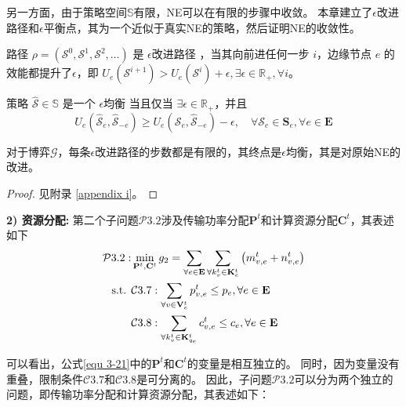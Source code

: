 \noindent 另一方面，由于策略空间$\mathbb{S}$有限，NE可以在有限的步骤中收敛。
本章建立了$\epsilon$改进路径和$\epsilon$平衡点\cite{chew2016potential}，其为一个近似于真实NE的策略，然后证明NE的收敛性。
\begin{definition} 
	路径 $\rho=\left(\mathcal{S}^{0}, \mathcal{S}^{1}, \mathcal{S}^{2}, \ldots\right)$ 是 $\epsilon$改进路径 \cite{chew2016potential}，当其向前进任何一步 $i$，边缘节点 $e$ 的效能都提升了$\epsilon$，即 $U_{e}\left(\mathcal{S}^{i+1}\right) > U_{e}\left(\mathcal{S}^{i}\right) + \epsilon, \exists \epsilon \in \mathbb{R}_{+}, \forall i$。
\end{definition}
\begin{definition}
	策略 $\mathcal{\hat{S}} \in \mathbb{S}$ 是一个 $\epsilon$均衡 \cite{chew2016potential} 当且仅当 $\exists \epsilon \in \mathbb{R}_{+}$，并且
	\begin{equation}
		U_{e}\left(\mathcal{\hat{S}}_{e}, \mathcal{\hat{S}}_{-e}\right) \geq U_{e}\left(\mathcal{S}_{e}, \mathcal{\hat{S}}_{-e}\right) - \epsilon, \quad \forall \mathcal{S}_{e} \in \mathbf{S}_{e}, \forall e \in \mathbf{E}
	\end{equation}
\end{definition}
\begin{theorem}
对于博弈$\mathcal{G}$，每条$\epsilon$改进路径的步数都是有限的，其终点是$\epsilon$均衡，其是对原始NE的改进。
\label{theorem 4-3}
\end{theorem}
\begin{proof} 见附录 \ref{appendix i}。
\end{proof}

\textbf{2) 资源分配:} 第二个子问题$\mathcal{P}3.2$涉及传输功率分配$\mathbf{P}^{t}$和计算资源分配$\mathbf{C}^{t}$，其表述如下
\begin{align}
	\mathcal{P}3.2: &\min_{\mathbf{P}^{t}, \mathbf{C}^{t}} g_2= \sum_{ \forall e \in \mathbf{E}} \sum_{\forall k_{v}^{t} \in \mathbf{K}_{e}^{t}} \left( m_{v, e}^{t} +  n_{v, e}^{t} \right) \notag \\
	\text { s.t. }
    &\mathcal{C}3.7: \sum_{\forall v \in \mathbf{V}_{e}^{t}} p_{v, e}^{t} \leq p_{e}, \forall e \in \mathbf{E} \notag \\
    &\mathcal{C}3.8: \sum_{\forall k_{v}^{t} \in {\mathbf{K}_{q_e}^{t} }} c_{v, e}^t \leq c_{e}, \forall e \in \mathbf{E}
\label{equ 3-21}
\end{align}

\noindent 可以看出，公式\ref{equ 3-21}中的$\mathbf{P}^{t}$和$\mathbf{C}^{t}$的变量是相互独立的。
同时，因为变量没有重叠，限制条件$\mathcal{C}3.7$和$\mathcal{C}3.8$是可分离的。
因此，子问题$\mathcal{P}3.2$可以分为两个独立的问题，即传输功率分配和计算资源分配，其表述如下：

